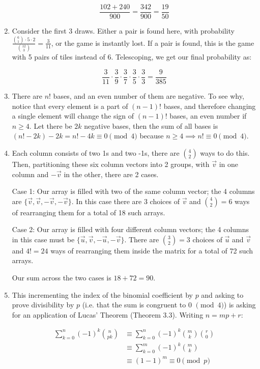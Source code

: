 \documentclass{book}
\numberwithin{equation}{section}
\begin{document}
\begin{enumerate}[label={9.\arabic*}]
$$\frac{102 + 240}{900} = \frac{342}{900} = \frac{19}{50}$$

\item
Consider the first 3 draws. Either a pair is found here, with probability
$\frac{{6 \choose 1}\cdot5\cdot2}{{12 \choose 3}} = \frac{3}{11}$, or the game is instantly lost. If a pair is found,
this is the game with 5 pairs of tiles instead of 6. Telescoping, we get our final probability as:

$$\frac{3}{11}\cdot\frac{3}{9}\cdot\frac{3}{7}\cdot\frac{3}{5}\cdot\frac{3}{3} = \frac{9}{385}$$

\item
There are $n!$ bases, and an even number of them are negative. To see why, notice that every element is a part of
$(n-1)!$ bases, and therefore changing a single element will change the sign of $(n-1)!$ bases, an even number if $n \geq 4$.
Let there be $2k$ negative bases, then the sum of all bases is $(n! - 2k) - 2k = n! - 4k \equiv 0 \pmod{4}$ because
$n \geq 4 \implies n! \equiv 0 \pmod{4}$.

\item
Each column consists of two 1s and two -1s, there are ${4 \choose 2}$ ways to do this. Then, partitioning these six
column vectors into 2 groups, with $\vec{v}$ in one column and $-\vec{v}$ in the other, there are 2 cases.

Case 1: Our array is filled with two of the same column vector; the 4 columns are $\{\vec{v}, \vec{v}, -\vec{v}, -\vec{v}\}$.
In this case there are 3 choices of $\vec{v}$ and ${4 \choose 2} = 6$ ways of rearranging them for a total of 18 such arrays.

Case 2: Our array is filled with four different column vectors; the 4 columns in this case must be
$\{\vec{u}, \vec{v}, -\vec{u}, -\vec{v}\}$. There are ${3 \choose 2} = 3$ choices of $\vec{u}$ and $\vec{v}$ and $4! = 24$
ways of rearranging them inside the matrix for a total of 72 such arrays.

Our sum across the two cases is $18 + 72 = 90$.

\item
This incrementing the index of the binomial coefficient by $p$ and asking to prove divisibility by $p$ (i.e. that the sum
is congruent to 0 $\pmod{4}$) is asking for an application of Lucas' Theorem (Theorem 3.3). Writing $n = mp + r$:

\begin{align*}
\sum_{k=0}^{n} (-1)^k{n \choose pk} & \equiv \sum_{k=0}^n (-1)^k{m \choose k}{r \choose 0} \\
& \equiv \sum_{k=0}^m (-1)^k{m \choose k} \\
& \equiv (1 - 1)^m \equiv 0 \pmod{p}
\end{align*}


\end{enumerate}
\end{document}
